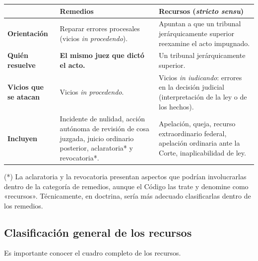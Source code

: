 \documentclass[12pt,oneside]{book}
\begin{document}
\begin{table}[H]
\centering
\small
\begin{tabularx}{\textwidth}{L{0.18\textwidth} >{\raggedright\arraybackslash}X >{\raggedright\arraybackslash}X}
\toprule
 & \textbf{Remedios} & \textbf{Recursos (\textit{stricto sensu})} \\
\midrule
\textbf{Orientación} &
Reparar errores procesales (vicios \textit{in procedendo}). &
Apuntan a que un tribunal jerárquicamente superior reexamine el acto impugnado. \\
\midrule
\textbf{Quién resuelve} &
\textbf{El mismo juez que dictó el acto.} &
Un tribunal jerárquicamente superior. \\
\midrule
\textbf{Vicios que se atacan} &
Vicios \textit{in procedendo}. &
Vicios \textit{in iudicando}: errores en la decisión judicial (interpretación de la ley o de los hechos). \\
\midrule
\textbf{Incluyen} &
Incidente de nulidad, acción autónoma de revisión de cosa juzgada, juicio ordinario posterior, aclaratoria* y revocatoria*. &
Apelación, queja, recurso extraordinario federal, apelación ordinaria ante la Corte, inaplicabilidad de ley. \\
\bottomrule
\end{tabularx}
\end{table}

(*) La aclaratoria y la revocatoria presentan aspectos que podrían involucrarlas dentro de la categoría de remedios, aunque el Código las trate y denomine como «recursos». Técnicamente, en doctrina, sería más adecuado clasificarlas dentro de los remedios.

\subsection{Clasificación general de los recursos}

Es importante conocer el cuadro completo de los recursos.
\end{document}
